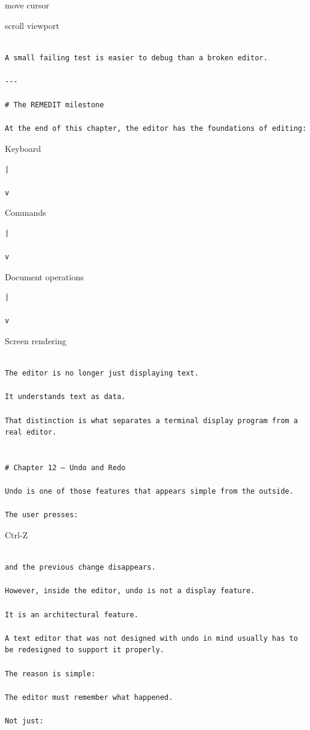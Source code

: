 \documentclass[
  oneside,
  openany]{book}
\begin{document}
move cursor

scroll viewport

\begin{verbatim}

A small failing test is easier to debug than a broken editor.

---

# The REMEDIT milestone

At the end of this chapter, the editor has the foundations of editing:
\end{verbatim}

Keyboard

\begin{verbatim}
|

v
\end{verbatim}

Commands

\begin{verbatim}
|

v
\end{verbatim}

Document operations

\begin{verbatim}
|

v
\end{verbatim}

Screen rendering

\begin{verbatim}

The editor is no longer just displaying text.

It understands text as data.

That distinction is what separates a terminal display program from a real editor.


# Chapter 12 — Undo and Redo

Undo is one of those features that appears simple from the outside.

The user presses:
\end{verbatim}

Ctrl-Z

\begin{verbatim}

and the previous change disappears.

However, inside the editor, undo is not a display feature.

It is an architectural feature.

A text editor that was not designed with undo in mind usually has to be redesigned to support it properly.

The reason is simple:

The editor must remember what happened.

Not just:
\end{verbatim}
\end{document}

